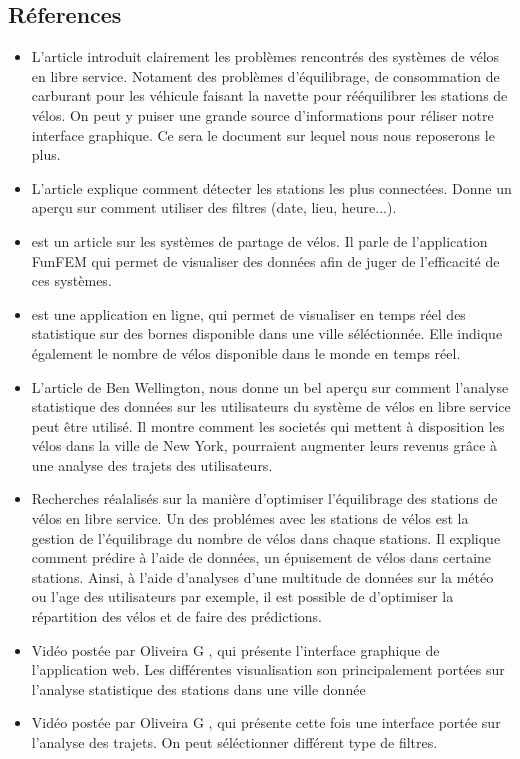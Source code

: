 \documentclass[12pt]{article}
\begin{document}
		\subsection{Réferences}
			\begin{itemize}
				\item L'article \cite{Oli16} introduit clairement les problèmes rencontrés des systèmes de vélos en libre service. Notament des problèmes d'équilibrage, de consommation de carburant pour les véhicule faisant la navette pour rééquilibrer les stations de vélos. On peut y puiser une grande source d'informations pour réliser notre interface graphique. Ce sera le document sur lequel nous nous reposerons le plus.

				\item L'article \cite{Ali14} explique comment détecter les stations les plus connectées. Donne un aperçu sur comment utiliser des filtres (date, lieu, heure...).

				\item \cite{BC16} est un article sur les systèmes de partage de vélos. Il parle de l'application FunFEM qui permet de visualiser des données afin de juger de l'efficacité de ces systèmes.

				\item \cite{BSM17} est une application en ligne, qui permet de visualiser en temps réel des statistique sur des bornes disponible dans une ville séléctionnée.  Elle indique également le nombre de vélos disponible dans le monde en temps réel.

				\item L'article \cite{BW} de Ben Wellington, nous donne un bel aperçu sur comment l'analyse statistique des données sur les utilisateurs du système de vélos en libre service peut être utilisé. Il montre comment les societés qui mettent à disposition les vélos dans la ville de New York, pourraient augmenter leurs revenus grâce à une analyse des trajets des utilisateurs.

				\item \cite{JL} Recherches réalalisés sur la manière d'optimiser l'équilibrage des stations de vélos en libre service. Un des problémes avec les stations de vélos est la gestion de l'équilibrage du nombre de  vélos dans chaque stations. Il explique comment prédire à l'aide de données, un épuisement de vélos dans certaine stations. Ainsi, à l'aide d'analyses d'une multitude de données sur la météo ou l'age des utilisateurs par exemple, il est possible de d'optimiser la répartition des vélos et de faire des prédictions.

				\item Vidéo postée par Oliveira G \cite{state_station}, qui présente l'interface graphique de l'application web. Les différentes visualisation son principalement portées sur l'analyse statistique des stations dans une ville donnée

				\item Vidéo postée par Oliveira G \cite{trips}, qui présente cette fois une interface portée sur l'analyse des trajets. On peut séléctionner différent type de filtres.

			\end{itemize}
			
\end{document}
